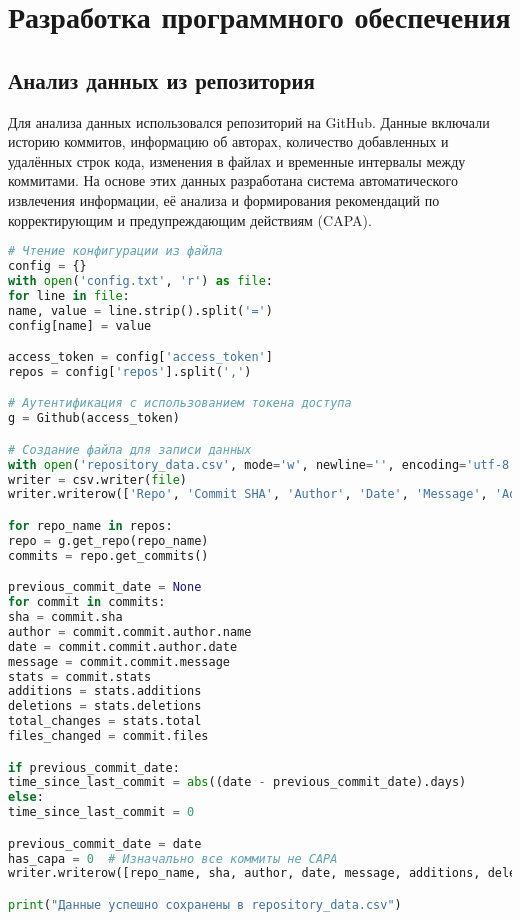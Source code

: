 \chapter{Разработка программного обеспечения} \label{ch3}

\section{Анализ данных из репозитория} \label{ch3:sec1}

Для анализа данных использовался репозиторий на GitHub. Данные включали историю коммитов, информацию об авторах, количество добавленных и удалённых строк кода, изменения в файлах и временные интервалы между коммитами. На основе этих данных разработана система автоматического извлечения информации, её анализа и формирования рекомендаций по корректирующим и предупреждающим действиям (CAPA).

\begin{lstlisting}[language=Python]
# Чтение конфигурации из файла
config = {}
with open('config.txt', 'r') as file:
for line in file:
name, value = line.strip().split('=')
config[name] = value

access_token = config['access_token']
repos = config['repos'].split(',')

# Аутентификация с использованием токена доступа
g = Github(access_token)

# Создание файла для записи данных
with open('repository_data.csv', mode='w', newline='', encoding='utf-8') as file:
writer = csv.writer(file)
writer.writerow(['Repo', 'Commit SHA', 'Author', 'Date', 'Message', 'Additions', 'Deletions', 'Total Changes', 'File Changes', 'Time Since Last Commit', 'Has CAPA'])

for repo_name in repos:
repo = g.get_repo(repo_name)
commits = repo.get_commits()

previous_commit_date = None
for commit in commits:
sha = commit.sha
author = commit.commit.author.name
date = commit.commit.author.date
message = commit.commit.message
stats = commit.stats
additions = stats.additions
deletions = stats.deletions
total_changes = stats.total
files_changed = commit.files

if previous_commit_date:
time_since_last_commit = abs((date - previous_commit_date).days)
else:
time_since_last_commit = 0

previous_commit_date = date
has_capa = 0  # Изначально все коммиты не CAPA
writer.writerow([repo_name, sha, author, date, message, additions, deletions, total_changes, len(files_changed), time_since_last_commit, has_capa])

print("Данные успешно сохранены в repository_data.csv")
\end{lstlisting}


